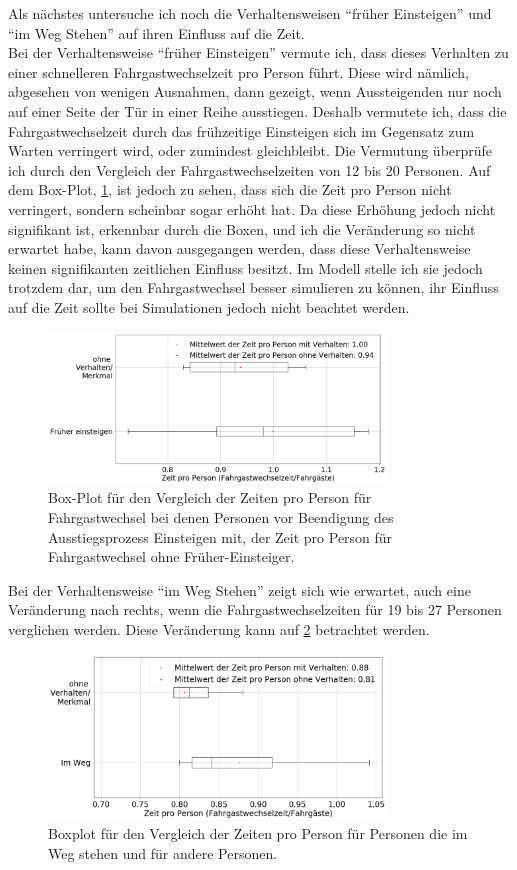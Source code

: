 Als nächstes untersuche ich noch die Verhaltensweisen "`früher Einsteigen"' und "`im Weg Stehen"' auf ihren Einfluss auf die Zeit.\\
Bei der Verhaltensweise "`früher Einsteigen"' vermute ich, dass dieses Verhalten zu einer schnelleren Fahrgastwechselzeit pro Person führt. Diese wird nämlich, abgesehen von wenigen Ausnahmen, dann gezeigt, wenn Aussteigenden nur noch auf einer Seite der Tür in einer Reihe ausstiegen. Deshalb vermutete ich, dass die Fahrgastwechselzeit durch das frühzeitige Einsteigen sich im Gegensatz zum Warten verringert wird, oder zumindest gleichbleibt. Die Vermutung überprüfe ich durch den Vergleich der Fahrgastwechselzeiten von 12 bis 20 Personen. Auf dem Box-Plot, \figurename \ref{fig:BoxPlotFrueherEinsteigen}, ist jedoch zu sehen, dass sich die Zeit pro Person nicht verringert, sondern scheinbar sogar erhöht hat. Da diese Erhöhung jedoch nicht signifikant ist, erkennbar durch die Boxen, und ich die Veränderung so nicht erwartet habe, kann davon ausgegangen werden, dass diese Verhaltensweise keinen signifikanten zeitlichen Einfluss besitzt. Im Modell stelle ich sie jedoch trotzdem dar, um den Fahrgastwechsel besser simulieren zu können, ihr Einfluss auf die Zeit sollte bei Simulationen jedoch nicht beachtet werden.
\begin{figure}[H]
	\centering
		\includegraphics[width=0.8\textwidth]{pictures/data_evaluation/behavior/comp_Fruehereinsteigen.png}
	\caption{Box-Plot für den Vergleich der Zeiten pro Person für Fahrgastwechsel bei denen Personen vor Beendigung des Ausstiegsprozess Einsteigen mit, der Zeit pro Person für Fahrgastwechsel ohne Früher-Einsteiger.}
	\label{fig:BoxPlotFrueherEinsteigen}
\end{figure}
Bei der Verhaltensweise "`im Weg Stehen"' zeigt sich wie erwartet, auch eine Veränderung nach rechts, wenn die Fahrgastwechselzeiten für 19 bis 27 Personen verglichen werden. Diese Veränderung kann auf \figurename \ref{fig:BoxPlotImWeg} betrachtet werden.
\begin{figure}[H]
	\centering
		\includegraphics[width=0.8\textwidth]{pictures/data_evaluation/behavior/comp_ImWeg.png}
	\caption{Boxplot für den Vergleich der Zeiten pro Person für Personen die im Weg stehen und für andere Personen.}
	\label{fig:BoxPlotImWeg}
\end{figure}
